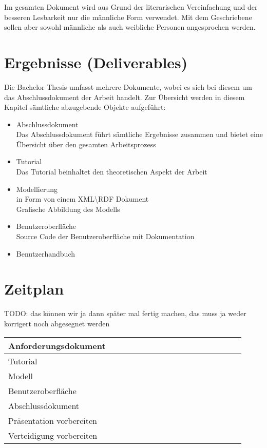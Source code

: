 Im gesamten Dokument wird aus Grund der literarischen Vereinfachung und der besseren Lesbarkeit nur die männliche Form verwendet. Mit dem Geschriebene sollen aber sowohl männliche als auch weibliche Personen angesprochen werden.

\section{Ergebnisse (Deliverables)}
\label{sec:admin_ergebniss}
Die Bachelor Thesis umfasst mehrere Dokumente, wobei es sich bei diesem um das Abschlussdokument der Arbeit handelt. Zur Übersicht werden in diesem Kapitel sämtliche abzugebende Objekte aufgeführt:
\begin{itemize}
	\item Abschlussdokument\\ Das Abschlussdokument führt sämtliche Ergebnisse zusammen und bietet eine Übersicht über den gesamten Arbeitsprozess
	\item Tutorial\\ Das Tutorial beinhaltet den theoretischen Aspekt der Arbeit
	\item Modellierung \\in Form von einem XML\textbackslash RDF Dokument\\ Grafische Abbildung des Modells
	\item Benutzeroberfläche\\ Source Code der Benutzeroberfläche mit Dokumentation
	\item Benutzerhandbuch 
\end{itemize}

\section{Zeitplan}
\label{sec:admin_zeitplan}
TODO: das können wir ja dann später mal fertig machen, das muss ja weder korrigert noch abgesegnet werden

\begin{center}
    \begin{tabular}{ | p{5cm} | l | l |l|l|l|l|l|l|l|l|l|l|l|l|l|l|} 
		\hline %
    Anforderungsdokument 	& \cellcolor{cyan} &  \cellcolor{cyan}&  \cellcolor{cyan}& & & & & & & & & & & & & \\  \hline  %
    Tutorial  & & & & & & & & & & & & & & & & \\  \hline 
    Modell  & & & & & & & & & & & & & & & & \\ \hline
    Benutzeroberfläche  & & & & & & & & & & & & & & & & \\  \hline
    Abschlussdokument  & & & & & & & & & & & & & & & & \\   \hline
    Präsentation vorbereiten  & & & & & & & & & & & & & & & &  \\  \hline
    Verteidigung vorbereiten  & & & & & & & & & & & & & & & &  \\  \hline		
    \end{tabular}
\end{center}